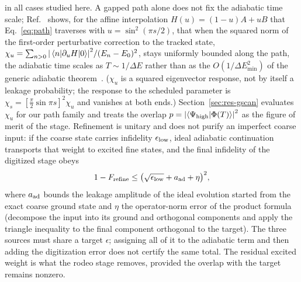 \documentclass[
  aps,            %
  prc,            %
  reprint,        %
  superscriptaddress,
  floatfix,
  nofootinbib
]{revtex4-2}
\begin{document}
in all cases studied here.  A gapped path alone does not fix the adiabatic
time scale; Ref.~\cite{Bogner2026} shows, for the affine interpolation
$H(u)=(1-u)A+uB$ that Eq.~\eqref{eq:path} traverses with $u=\sin^2(\pi s/2)$,
that when the squared norm of the first-order perturbative correction to the
tracked state,
$\chi_u=\sum_{n>0}\abs{\mel{n}{\partial_uH}{0}}^2/(E_n-E_0)^2$, stays
uniformly bounded along the path, the adiabatic time scales as
$T\sim1/\Delta E$ rather than as the $O(1/\Delta E_{\min}^2)$ of the generic
adiabatic theorem~\cite{Albash2018}.  ($\chi_u$ is a squared eigenvector
response, not by itself a leakage probability; the response to the scheduled
parameter is $\chi_s=[\tfrac{\pi}{2}\sin\pi s]^2\chi_u$ and vanishes at both
ends.)  Section~\ref{sec:res-gscan} evaluates
$\chi_u$ for our path family and treats the overlap
$p=\abs{\braket{\Psi_{\rm high}}{\Phi(T)}}^2$ as the figure of merit of the
stage.  Refinement is unitary and does not purify an imperfect coarse
input: if the coarse state carries infidelity $\epsilon_{\rm low}$, ideal
adiabatic continuation transports that weight to excited fine states, and the
final infidelity of the digitized stage obeys
\begin{equation}
  1-F_{\rm refine}\le\big(\sqrt{\epsilon_{\rm low}}+a_{\rm ad}+\eta\big)^2,
  \label{eq:budget}
\end{equation}
where $a_{\rm ad}$ bounds the leakage amplitude of the ideal evolution started
from the exact coarse ground state and $\eta$ the operator-norm error of the
product formula (decompose the input into its ground and orthogonal
components and apply the triangle inequality to the final component
orthogonal to the target).  The three sources must share a target
$\epsilon$; assigning all of it to the adiabatic term and then adding the
digitization error does not certify the same total.  The residual excited
weight is what the rodeo stage removes, provided the overlap with the target
remains nonzero.
\end{document}
